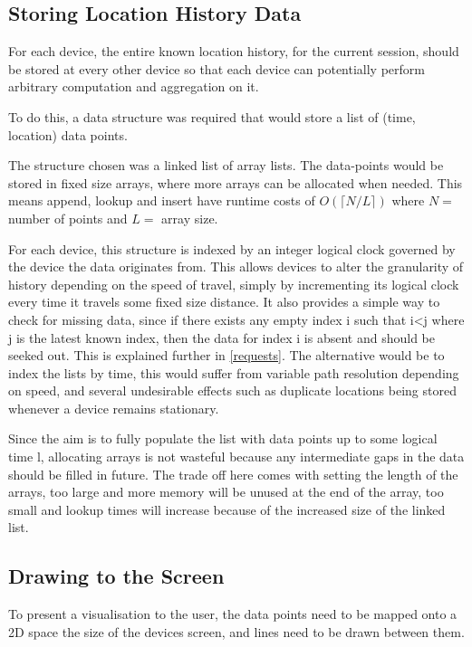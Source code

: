 \subsection{Storing Location History Data}

For each device, the entire known location history, for the current session, should be stored at every other device so that each device can potentially perform arbitrary computation and aggregation on it.

To do this, a data structure was required that would store a list of (time, location) data points.

The structure chosen was a linked list of array lists. The data-points would be stored in fixed size arrays, where more arrays can be allocated when needed. This means append, lookup and insert have runtime costs of $ O(\lceil N/L \rceil ) $ where $ N = $ number of points and $ L =$ array size.

For each device, this structure is indexed by an integer logical clock governed by the device the data originates from. This allows devices to alter the granularity of history depending on the speed of travel, simply by incrementing its logical clock every time it travels some fixed size distance. It also provides a simple way to check for missing data, since if there exists any empty index i such that i<j where j is the latest known index, then the data for index i is absent and should be seeked out. This is explained further in \ref{requests}.
The alternative would be to index the lists by time, this would suffer from variable path resolution depending on speed, and several undesirable effects such as duplicate locations being stored whenever a device remains stationary.

Since the aim is to fully populate the list with data points up to some logical time l, allocating arrays is not wasteful because any intermediate gaps in the data should be filled in future. The trade off here comes with setting the length of the arrays, too large and more memory will be unused at the end of the array, too small and lookup times will increase because of the increased size of the linked list.

\subsection{Drawing to the Screen}

To present a visualisation to the user, the data points need to be mapped onto a 2D space the size of the devices screen, and lines need to be drawn between them.

